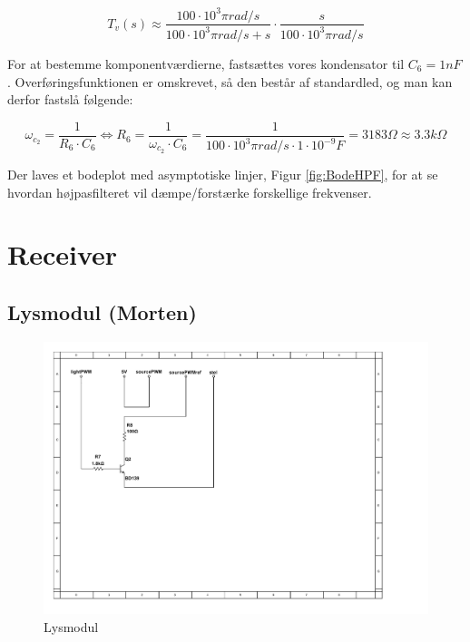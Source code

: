 \begin{displaymath}
T_{v}(s)\approx 
\dfrac{100\cdot 10^{3}\pi rad/s}{100\cdot 10^{3}\pi rad/s +s} \cdot \dfrac{s}{100\cdot 10^{3}\pi rad/s}
\end{displaymath}

For at bestemme komponentværdierne, fastsættes vores kondensator til $C_{6} = 1nF$. Overføringsfunktionen er omskrevet, så den består af standardled, og man kan derfor fastslå følgende:

\begin{displaymath}
\omega_{c_{2}} = \dfrac{1}{R_{6} \cdot C_{6}} \Leftrightarrow
R_{6} = \dfrac{1}{\omega_{c_{2}} \cdot C_{6}} = \dfrac{1}{100\cdot 10^{3}\pi rad/s \cdot 1\cdot 10^{-9}F} = 3183 \Omega \approx 3.3k \Omega
\end{displaymath}

Der laves et bodeplot med asymptotiske linjer, Figur \ref{fig:BodeHPF}, for at se hvordan højpasfilteret vil dæmpe/forstærke forskellige frekvenser.

\section{Receiver}

\subsection{Lysmodul (Morten)}

\begin{figure}[h]
	\centering
	\includegraphics[scale=0.8, trim=50 250 440 60, clip=true]{../HardwareDesign/Diagrammer/Lysmodul.pdf}
	\caption{Lysmodul}
	\label{fig:Lysmodul-kredslob}
\end{figure}

